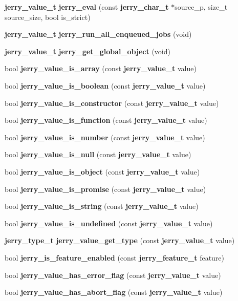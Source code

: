 \begin{DoxyCompactItemize}
\item 
\textbf{ jerry\+\_\+value\+\_\+t} {\bfseries jerry\+\_\+eval} (const \textbf{ jerry\+\_\+char\+\_\+t} $\ast$source\+\_\+p, size\+\_\+t source\+\_\+size, bool is\+\_\+strict)
\item 
\textbf{ jerry\+\_\+value\+\_\+t} {\bfseries jerry\+\_\+run\+\_\+all\+\_\+enqueued\+\_\+jobs} (void)
\item 
\textbf{ jerry\+\_\+value\+\_\+t} \textbf{ jerry\+\_\+get\+\_\+global\+\_\+object} (void)
\item 
bool \textbf{ jerry\+\_\+value\+\_\+is\+\_\+array} (const \textbf{ jerry\+\_\+value\+\_\+t} value)
\item 
bool {\bfseries jerry\+\_\+value\+\_\+is\+\_\+boolean} (const \textbf{ jerry\+\_\+value\+\_\+t} value)
\item 
bool {\bfseries jerry\+\_\+value\+\_\+is\+\_\+constructor} (const \textbf{ jerry\+\_\+value\+\_\+t} value)
\item 
bool {\bfseries jerry\+\_\+value\+\_\+is\+\_\+function} (const \textbf{ jerry\+\_\+value\+\_\+t} value)
\item 
bool {\bfseries jerry\+\_\+value\+\_\+is\+\_\+number} (const \textbf{ jerry\+\_\+value\+\_\+t} value)
\item 
bool {\bfseries jerry\+\_\+value\+\_\+is\+\_\+null} (const \textbf{ jerry\+\_\+value\+\_\+t} value)
\item 
bool {\bfseries jerry\+\_\+value\+\_\+is\+\_\+object} (const \textbf{ jerry\+\_\+value\+\_\+t} value)
\item 
bool {\bfseries jerry\+\_\+value\+\_\+is\+\_\+promise} (const \textbf{ jerry\+\_\+value\+\_\+t} value)
\item 
bool {\bfseries jerry\+\_\+value\+\_\+is\+\_\+string} (const \textbf{ jerry\+\_\+value\+\_\+t} value)
\item 
bool {\bfseries jerry\+\_\+value\+\_\+is\+\_\+undefined} (const \textbf{ jerry\+\_\+value\+\_\+t} value)
\item 
\textbf{ jerry\+\_\+type\+\_\+t} {\bfseries jerry\+\_\+value\+\_\+get\+\_\+type} (const \textbf{ jerry\+\_\+value\+\_\+t} value)
\item 
bool \textbf{ jerry\+\_\+is\+\_\+feature\+\_\+enabled} (const \textbf{ jerry\+\_\+feature\+\_\+t} feature)
\item 
bool \textbf{ jerry\+\_\+value\+\_\+has\+\_\+error\+\_\+flag} (const \textbf{ jerry\+\_\+value\+\_\+t} value)
\item 
bool {\bfseries jerry\+\_\+value\+\_\+has\+\_\+abort\+\_\+flag} (const \textbf{ jerry\+\_\+value\+\_\+t} value)

\end{DoxyCompactItemize}
